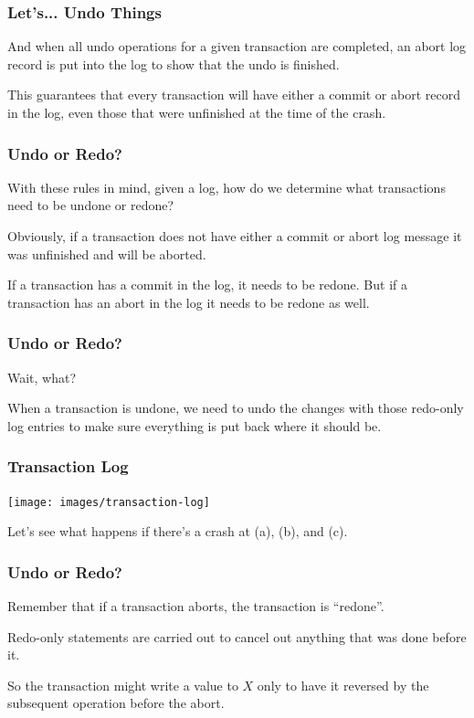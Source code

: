 \begin{frame}
\frametitle{Let's... Undo Things}

And when all undo operations for a given transaction are completed, an abort log record is put into the log to show that the undo is finished. 

This guarantees that every transaction will have either a commit or abort record in the log, even those that were unfinished at the time of the crash.

\end{frame}


\begin{frame}
\frametitle{Undo or Redo?}

With these rules in mind, given a log, how do we determine what transactions need to be undone or redone? 

Obviously, if a transaction does not have either a commit or abort log message it was unfinished and will be aborted. 

If a transaction has a commit in the log, it needs to be redone. But if a transaction has an abort in the log it needs to be redone as well.

\end{frame}

\begin{frame}
\frametitle{Undo or Redo?}
Wait, what? 

When a transaction is undone, we need to undo the changes with those redo-only log entries to make sure everything is put back where it should be.

\end{frame}


\begin{frame}
\frametitle{Transaction Log}

\begin{center}
	\texttt{[image: images/transaction-log]}
\end{center}

Let's see what happens if there's a crash at (a), (b), and (c).

\end{frame}

\begin{frame}
\frametitle{Undo or Redo?}

Remember that if a transaction aborts, the transaction is ``redone''. 

Redo-only statements are carried out to cancel out anything that was done before it. 

So the transaction might write a value to $X$ only to have it reversed by the subsequent operation before the abort.

\end{frame}


